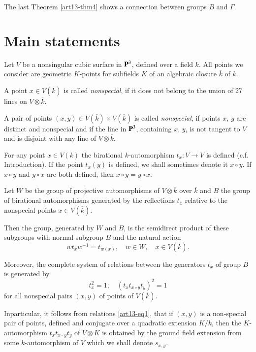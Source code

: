 The last Theorem \ref{art13-thm4} shows a connection between groups $B$ and $\Gamma$.

\section*{Main statements}

Let $V$ be a nonsingular cubic surface in $\mathbf{P}^{3}$, defined over a field $k$. All points we consider are geometric $K$-points for subfields $K$ of an algebraic closure $\overline{k}$ of $k$.

A point $x\in V(\overline{k})$ is called {\em nonspecial}, if it does not belong to the union of 27 lines on $V\otimes \overline{k}$.

A pair of points $(x,y)\in V(\overline{k})\times V(\overline{k})$ is called {\em nonspecial}, if points $x$, $y$ are distinct and nonspecial and if the line in $\mathbf{P}^{3}$, containing $x$, $y$, is not tangent to $V$ and is disjoint with any line of $V\otimes\overline{k}$.

For any point $x\in V(k)$ the birational $k$-automorphism $t_{x}:V\to V$ is defined (c.f. Introduction). If the point $t_{x}(y)$ is defined, we shall sometimes denote it $x\circ y$. If $x\circ y$ and $y\circ x$ are both defined, then $x\circ y=y\circ x$.

\begin{theorem}\label{art13-thm1}
Let $W$ be the group of projective automorphisms of $V\otimes \overline{k}$ over $\overline{k}$ and $B$ the group of birational automorphisms generated by the reflections $t_{x}$ relative to the nonspecial points $x\in V(\overline{k})$.

Then the group, generated by $W$ and $B$, is the semidirect product of these subgroups with normal subgroup $B$ and the natural action
$$
wt_{x}w^{-1}=t_{w(x)},\quad w\in W, \quad x\in V(\overline{k}).
$$

Moreover, the complete system of relations between the generators $t_{x}$ of group $B$ is generated by
\begin{equation}
t^{2}_{x}=1;\quad (t_{x}t_{x\circ y}t_{y})^{2}=1\label{art13-eq1}
\end{equation}
for all nonspecial pairs $(x,y)$ of points of $V(\overline{k})$.
\end{theorem}

In\pageoriginale particular, it follows from relations \eqref{art13-eq1}, that if $(x,y)$ is a non-special pair of points, defined and conjugate over a quadratic extension $K/k$, then the $K$-automorphism $t_{x}t_{x\circ y}t_{y}$ of $V\otimes K$ is obtained by the ground field extension from some $k$-automorphism of $V$ which we shall denote $s_{x,y}$.

